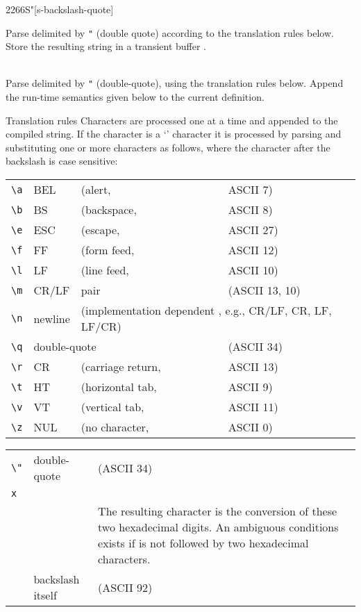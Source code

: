 \enlargethispage{12ex}
\begin{worddef}[Seq]{2266}{S\bs"}[s-backslash-quote]%

\interpret

	Parse  delimited by \texttt{"} (double quote) according to the
	translation rules below.  Store the resulting string in a transient buffer
	.

\compile {} \\
	Parse  delimited by \verb|"| (double-quote), using the
	translation rules below. Append the run-time semantics given below to
	the current definition.

\item[Translation rules]
	Characters are processed one at a time and appended to the compiled
	string. If the character is a `\bs' character it is processed by
	parsing and substituting one or more \linebreak characters as follows, where
	the character after the backslash is case sensitive:

	\begin{tabular}{llll}
		\verb|\a|	& BEL		& (alert,		& ASCII 7) \\
		\verb|\b|	& BS		& (backspace,	& ASCII 8) \\
		\verb|\e|	& ESC		& (escape,		& ASCII 27) \\
		\verb|\f|	& FF		& (form feed,	& ASCII 12) \\
		\verb|\l|	& LF		& (line feed,	& ASCII 10) \\
		\verb|\m|	& CR/LF	& pair			& (ASCII 13, 10) \\
		\verb|\n|	& newline& \multicolumn{2}{l}{(implementation dependent , e.g., CR/LF, CR, LF, LF/CR)} \\
		\verb|\q|	& \multicolumn{2}{l}{double-quote} & (ASCII 34) \\
		\verb|\r|	& CR		& (carriage return,	& ASCII 13) \\
		\verb|\t|	& HT		& (horizontal tab,	& ASCII 9) \\
		\verb|\v|	& VT		& (vertical tab,		& ASCII 11) \\
		\verb|\z|	& NUL		& (no character,		& ASCII 0) \\
	\end{tabular}

	\begin{tabular}{llll}
		\verb|\"|	& \multicolumn{2}{l}{double-quote} & (ASCII 34) \\
		\multicolumn{3}{l}{\texttt{\bs{}x}\arg{hexdigit}\arg{hexdigit}} \\
		&&\multicolumn{2}{p{27em}}{
			The resulting character is the conversion of these two hexadecimal
			digits. An ambiguous conditions exists if \texttt{\bs{x}} is not
			followed by two hexadecimal characters.} \\
		\texttt{\bs\bs} & \multicolumn{2}{l}{backslash itself} & (ASCII 92)
	\end{tabular}


\end{worddef}
